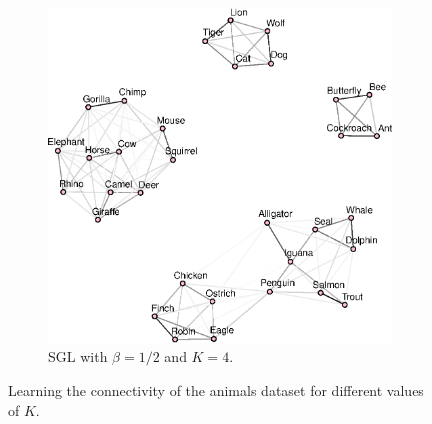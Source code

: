 \begin{figure}[!htb]
\begin{subfigure}[b]{0.475\textwidth}
      \includegraphics[width=\textwidth]{animals/graphs_for_different_k/animals_graph_k4.eps}
      \caption{\textsf{SGL} with $\beta = 1/2$ and $K = 4$.}
    \end{subfigure}
    \caption{Learning the connectivity of the \textsf{animals} dataset for different values of $K$.}
    \label{fig:animals}
\end{figure}
